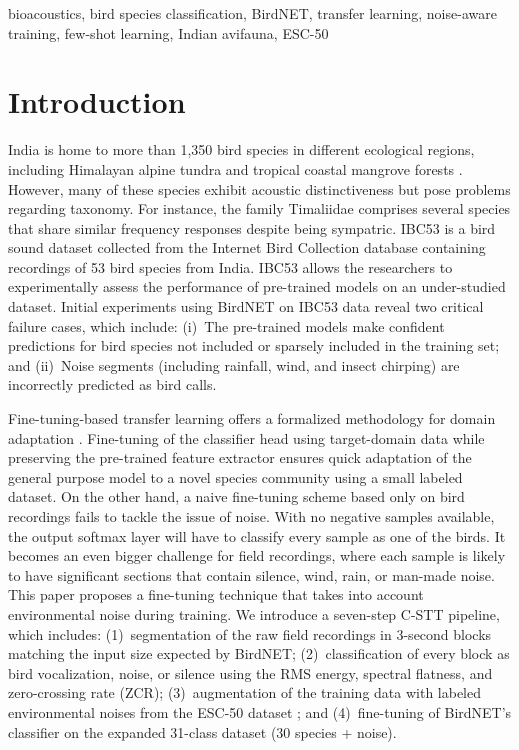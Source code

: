 \documentclass[conference]{IEEEtran}
\begin{document}
\begin{IEEEkeywords}
bioacoustics, bird species classification, BirdNET, transfer learning, noise-aware training, few-shot learning, Indian avifauna, ESC-50
\end{IEEEkeywords}

\section{Introduction}

India is home to more than 1,350 bird species in different ecological regions, including Himalayan alpine tundra and tropical coastal mangrove forests \cite{b7}. However, many of these species exhibit acoustic distinctiveness but pose problems regarding taxonomy. For instance, the family Timaliidae comprises several species that share similar frequency responses despite being sympatric. IBC53 is a bird sound dataset collected from the Internet Bird Collection database containing recordings of 53 bird species from India. IBC53 allows the researchers to experimentally assess the performance of pre-trained models on an under-studied dataset. Initial experiments using BirdNET on IBC53 data reveal two critical failure cases, which include: (i)~The pre-trained models make confident predictions for bird species not included or sparsely included in the training set; and (ii)~Noise segments (including rainfall, wind, and insect chirping) are incorrectly predicted as bird calls.

Fine-tuning-based transfer learning offers a formalized methodology for domain adaptation \cite{b8}. Fine-tuning of the classifier head using target-domain data while preserving the pre-trained feature extractor ensures quick adaptation of the general purpose model to a novel species community using a small labeled dataset. On the other hand, a naive fine-tuning scheme based only on bird recordings fails to tackle the issue of noise. With no negative samples available, the output softmax layer will have to classify every sample as one of the birds. It becomes an even bigger challenge for field recordings, where each sample is likely to have significant sections that contain silence, wind, rain, or man-made noise. This paper proposes a fine-tuning technique that takes into account environmental noise during training. We introduce a seven-step C-STT pipeline, which includes: (1)~segmentation of the raw field recordings in 3-second blocks matching the input size expected by BirdNET; (2)~classification of every block as bird vocalization, noise, or silence using the RMS energy, spectral flatness, and zero-crossing rate (ZCR); (3)~augmentation of the training data with labeled environmental noises from the ESC-50 dataset \cite{b2}; and (4)~fine-tuning of BirdNET's classifier on the expanded 31-class dataset (30 species + noise).
\end{document}
